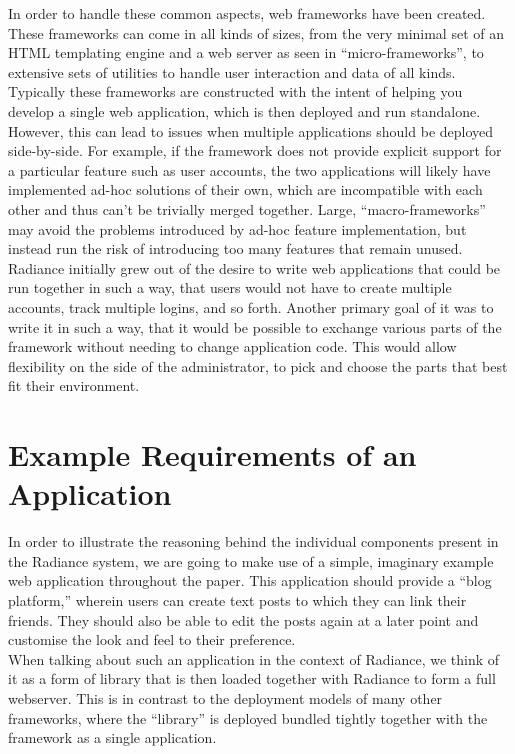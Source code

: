 \documentclass{sig-alternate}
\begin{document}
In order to handle these common aspects, web frameworks have been created. These frameworks can come in all kinds of sizes, from the very minimal set of an HTML templating engine and a web server as seen in ``micro-frameworks''\cite{microframeworks}, to extensive sets of utilities to handle user interaction and data of all kinds. \\

Typically these frameworks are constructed with the intent of helping you develop a single web application, which is then deployed and run standalone. However, this can lead to issues when multiple applications should be deployed side-by-side. For example, if the framework does not provide explicit support for a particular feature such as user accounts, the two applications will likely have implemented ad-hoc solutions of their own, which are incompatible with each other and thus can't be trivially merged together. Large, ``macro-frameworks'' may avoid the problems introduced by ad-hoc feature implementation, but instead run the risk of introducing too many features that remain unused. \\

Radiance initially grew out of the desire to write web applications that could be run together in such a way, that users would not have to create multiple accounts, track multiple logins, and so forth. Another primary goal of it was to write it in such a way, that it would be possible to exchange various parts of the framework without needing to change application code. This would allow flexibility on the side of the administrator, to pick and choose the parts that best fit their environment.

\section{Example Requirements of an Application}
In order to illustrate the reasoning behind the individual components present in the Radiance system, we are going to make use of a simple, imaginary example web application throughout the paper. This application should provide a ``blog platform,'' wherein users can create text posts to which they can link their friends. They should also be able to edit the posts again at a later point and customise the look and feel to their preference. \\

When talking about such an application in the context of Radiance, we think of it as a form of library that is then loaded together with Radiance to form a full webserver. This is in contrast to the deployment models of many other frameworks, where the ``library'' is deployed bundled tightly together with the framework as a single application. \\
\end{document}
